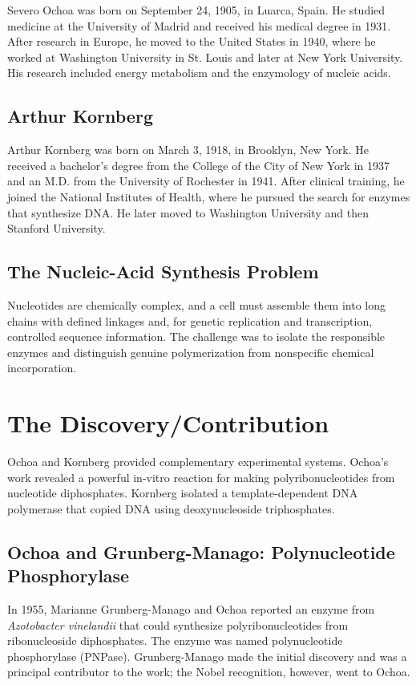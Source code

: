 Severo Ochoa was born on September 24, 1905, in Luarca, Spain. He studied medicine at the University of Madrid and received his medical degree in 1931. After research in Europe, he moved to the United States in 1940, where he worked at Washington University in St. Louis and later at New York University. His research included energy metabolism and the enzymology of nucleic acids.

\subsection{Arthur Kornberg}

Arthur Kornberg was born on March 3, 1918, in Brooklyn, New York. He received a bachelor's degree from the College of the City of New York in 1937 and an M.D. from the University of Rochester in 1941. After clinical training, he joined the National Institutes of Health, where he pursued the search for enzymes that synthesize DNA. He later moved to Washington University and then Stanford University.

\subsection{The Nucleic-Acid Synthesis Problem}

Nucleotides are chemically complex, and a cell must assemble them into long chains with defined linkages and, for genetic replication and transcription, controlled sequence information. The challenge was to isolate the responsible enzymes and distinguish genuine polymerization from nonspecific chemical incorporation.

\section{The Discovery/Contribution}

Ochoa and Kornberg provided complementary experimental systems. Ochoa's work revealed a powerful in-vitro reaction for making polyribonucleotides from nucleotide diphosphates. Kornberg isolated a template-dependent DNA polymerase that copied DNA using deoxynucleoside triphosphates.

\subsection{Ochoa and Grunberg-Manago: Polynucleotide Phosphorylase}

In 1955, Marianne Grunberg-Manago and Ochoa reported an enzyme from \textit{Azotobacter vinelandii} that could synthesize polyribonucleotides from ribonucleoside diphosphates. The enzyme was named polynucleotide phosphorylase (PNPase). Grunberg-Manago made the initial discovery and was a principal contributor to the work; the Nobel recognition, however, went to Ochoa.

